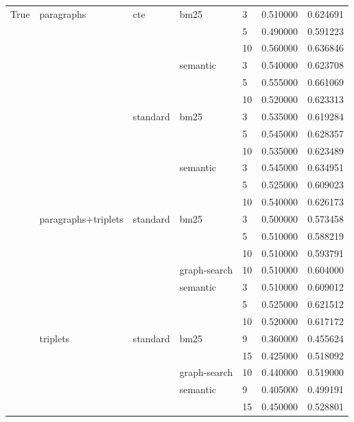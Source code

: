 \begin{tabular}{lllllrr}
\multirow[t]{24}{*}{True} & \multirow[t]{12}{*}{paragraphs} & \multirow[t]{6}{*}{cte} & \multirow[t]{3}{*}{bm25} & 3 & 0.510000 & 0.624691 \\
 &  &  &  & 5 & 0.490000 & 0.591223 \\
 &  &  &  & 10 & 0.560000 & 0.636846 \\
\cline{4-7}
 &  &  & \multirow[t]{3}{*}{semantic} & 3 & 0.540000 & 0.623708 \\
 &  &  &  & 5 & 0.555000 & 0.661069 \\
 &  &  &  & 10 & 0.520000 & 0.623313 \\
\cline{3-7} \cline{4-7}
 &  & \multirow[t]{6}{*}{standard} & \multirow[t]{3}{*}{bm25} & 3 & 0.535000 & 0.619284 \\
 &  &  &  & 5 & 0.545000 & 0.628357 \\
 &  &  &  & 10 & 0.535000 & 0.623489 \\
\cline{4-7}
 &  &  & \multirow[t]{3}{*}{semantic} & 3 & 0.545000 & 0.634951 \\
 &  &  &  & 5 & 0.525000 & 0.609023 \\
 &  &  &  & 10 & 0.540000 & 0.626173 \\
\cline{2-7} \cline{3-7} \cline{4-7}
 & \multirow[t]{7}{*}{paragraphs+triplets} & \multirow[t]{7}{*}{standard} & \multirow[t]{3}{*}{bm25} & 3 & 0.500000 & 0.573458 \\
 &  &  &  & 5 & 0.510000 & 0.588219 \\
 &  &  &  & 10 & 0.510000 & 0.593791 \\
\cline{4-7}
 &  &  & graph-search & 10 & 0.510000 & 0.604000 \\
\cline{4-7}
 &  &  & \multirow[t]{3}{*}{semantic} & 3 & 0.510000 & 0.609012 \\
 &  &  &  & 5 & 0.525000 & 0.621512 \\
 &  &  &  & 10 & 0.520000 & 0.617172 \\
\cline{2-7} \cline{3-7} \cline{4-7}
 & \multirow[t]{5}{*}{triplets} & \multirow[t]{5}{*}{standard} & \multirow[t]{2}{*}{bm25} & 9 & 0.360000 & 0.455624 \\
 &  &  &  & 15 & 0.425000 & 0.518092 \\
\cline{4-7}
 &  &  & graph-search & 10 & 0.440000 & 0.519000 \\
\cline{4-7}
 &  &  & \multirow[t]{2}{*}{semantic} & 9 & 0.405000 & 0.499191 \\
 &  &  &  & 15 & 0.450000 & 0.528801 \\
\cline{1-7} \cline{2-7} \cline{3-7} \cline{4-7}
\bottomrule
\end{tabular}
